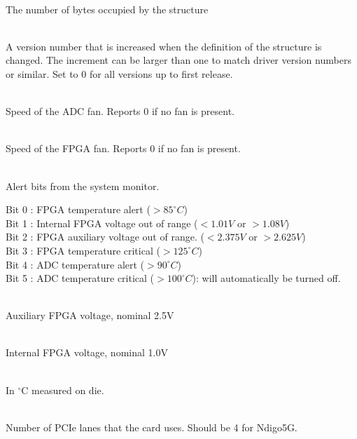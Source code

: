 			\\
			The number of bytes occupied by the structure\par

			\\
			A version number that is increased when the definition of the structure is changed. The increment can be larger than one to match driver version numbers or similar. Set to 0 for all versions up to first release.\par

			\\
			Speed of the ADC fan. Reports 0 if no fan is present.\par

			\\
			Speed of the FPGA fan. Reports 0 if no fan is present.\par

			\\
			Alert bits from the system monitor.\par
			
			\noindent Bit 0 : FPGA temperature alert ($> 85^{\circ}C$)\\
			Bit 1 : Internal FPGA voltage out of range ($< 1.01V$ or $> 1.08V$)\\
			Bit 2 : FPGA auxiliary voltage out of range. ($< 2.375V$ or $>  2.625V$)\\
			Bit 3 : FPGA temperature critical ($> 125^{\circ}C$)\\
			Bit 4 : ADC temperature alert ($> 90^{\circ}C$)\\
			Bit 5 : ADC temperature critical ($> 100^{\circ}C$): will automatically be turned off.\par

			\\
			Auxiliary FPGA voltage, nominal 2.5V\par

			\\
			Internal FPGA voltage, nominal 1.0V\par

			\\
			In $^\circ$C measured on die.\par

			\\
			Number of PCIe lanes that the card uses. Should be 4 for Ndigo5G. \par %

